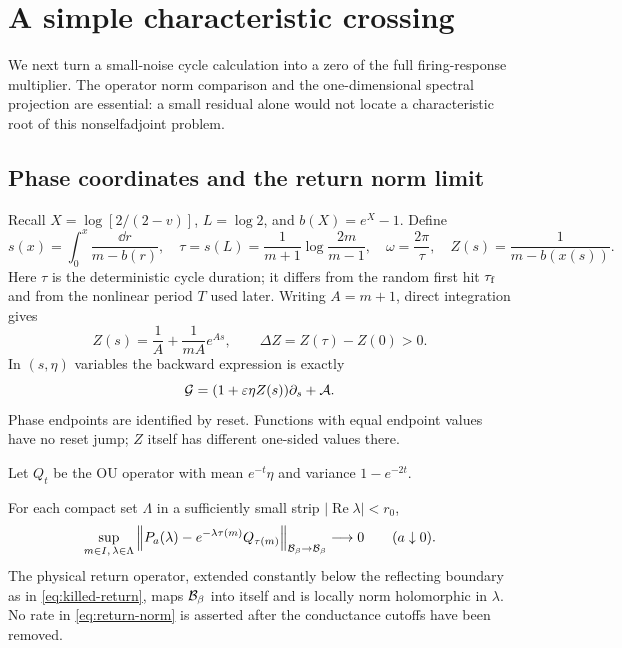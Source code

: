 \section{A simple characteristic crossing}\label{sec:crossing}

We next turn a small-noise cycle calculation into a zero of the full
firing-response multiplier. The operator norm comparison and the
one-dimensional spectral projection are essential: a small residual
alone would not locate a characteristic root of this nonselfadjoint
problem.

\subsection{Phase coordinates and the return norm limit}

Recall $X=\log[2/(2-v)]$, $L=\log2$, and $b(X)=e^X-1$. Define
\begin{equation}\label{eq:phase}
 s(x)=\int_0^x\frac{\dd r}{m-b(r)},\quad
 \tau=s(L)=\frac1{m+1}\log\frac{2m}{m-1},\quad
 \omega=\frac{2\pi}{\tau},\quad Z(s)=\frac1{m-b(x(s))}.
\end{equation}
Here $\tau$ is the deterministic cycle duration; it differs from the
random first hit ${\tau_{\mathrm f}}$ and from the nonlinear period $T$ used later.
Writing $A=m+1$, direct integration gives
\begin{equation}\label{eq:Z-formula}
 Z(s)=\frac1A+\frac1{mA}e^{As},\qquad
 \Delta Z=Z(\tau)-Z(0)>0.
\end{equation}
In $(s,\eta)$ variables the backward expression is exactly
\begin{equation}\label{eq:phase-generator}
 \mathcal G=(1+\varepsilon\eta Z(s))\partial_s+\mathcal A.
\end{equation}
Phase endpoints are identified by reset. Functions with equal endpoint
values have no reset jump; $Z$ itself has different one-sided values
there.

Let $Q_t$ be the OU operator with mean $e^{-t}\eta$ and variance
$1-e^{-2t}$.

\begin{proposition}\label{prop:return-norm}
For each compact set $\Lambda$ in a sufficiently small strip
$|\operatorname{Re}\lambda|<r_0$,
\begin{equation}\label{eq:return-norm}
 \sup_{m\in I,\,\lambda\in\Lambda}
 \left\|P_a(\lambda)-e^{-\lambda\tau(m)}Q_{\tau(m)}\right\|_{\mathcal B_\beta\to\mathcal B_\beta}
       \longrightarrow0\qquad(a\downarrow0).
\end{equation}
The physical return operator, extended constantly below the reflecting
boundary as in \eqref{eq:killed-return}, maps $\mathcal B_\beta$ into itself and is locally
norm holomorphic in $\lambda$. No rate in \eqref{eq:return-norm} is
asserted after the conductance cutoffs have been removed.
\end{proposition}

